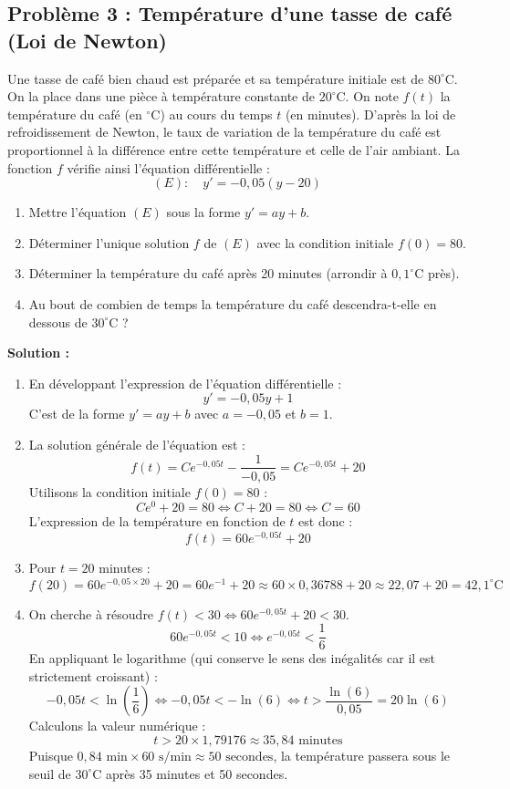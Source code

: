 \subsection*{Problème 3 : Température d'une tasse de café (Loi de Newton)}
Une tasse de café bien chaud est préparée et sa température initiale est de $80^\circ$C. On la place dans une pièce à température constante de $20^\circ$C. On note $f(t)$ la température du café (en $^\circ$C) au cours du temps $t$ (en minutes).
D'après la loi de refroidissement de Newton, le taux de variation de la température du café est proportionnel à la différence entre cette température et celle de l'air ambiant.
La fonction $f$ vérifie ainsi l'équation différentielle :
\[
(E) : \quad y' = -0,05(y - 20)
\]
\begin{enumerate}
    \item Mettre l'équation $(E)$ sous la forme $y' = ay + b$.
    \item Déterminer l'unique solution $f$ de $(E)$ avec la condition initiale $f(0) = 80$.
    \item Déterminer la température du café après 20 minutes (arrondir à $0,1^\circ$C près).
    \item Au bout de combien de temps la température du café descendra-t-elle en dessous de $30^\circ$C ?
\end{enumerate}

\textbf{Solution :}
\begin{enumerate}
    \item En développant l'expression de l'équation différentielle :
    \[
    y' = -0,05y + 1
    \]
    C'est de la forme $y' = ay+b$ avec $a = -0,05$ et $b = 1$.
    
    \item La solution générale de l'équation est :
    \[
    f(t) = C e^{-0,05t} - \frac{1}{-0,05} = C e^{-0,05t} + 20
    \]
    Utilisons la condition initiale $f(0) = 80$ :
    \[
    C e^0 + 20 = 80 \iff C + 20 = 80 \iff C = 60
    \]
    L'expression de la température en fonction de $t$ est donc :
    \[
    f(t) = 60e^{-0,05t} + 20
    \]
    
    \item Pour $t = 20$ minutes :
    \[
    f(20) = 60e^{-0,05 \times 20} + 20 = 60e^{-1} + 20 \approx 60 \times 0,36788 + 20 \approx 22,07 + 20 = 42,1^\circ\text{C}
    \]
    
    \item On cherche à résoudre $f(t) < 30 \iff 60e^{-0,05t} + 20 < 30$.
    \[
    60e^{-0,05t} < 10 \iff e^{-0,05t} < \frac{1}{6}
    \]
    En appliquant le logarithme (qui conserve le sens des inégalités car il est strictement croissant) :
    \[
    -0,05t < \ln\left(\frac{1}{6}\right) \iff -0,05t < -\ln(6) \iff t > \frac{\ln(6)}{0,05} = 20 \ln(6)
    \]
    Calculons la valeur numérique :
    \[
    t > 20 \times 1,79176 \approx 35,84 \text{ minutes}
    \]
    Puisque $0,84 \text{ min} \times 60 \text{ s/min} \approx 50 \text{ secondes}$, la température passera sous le seuil de $30^\circ$C après 35 minutes et 50 secondes.
\end{enumerate}

